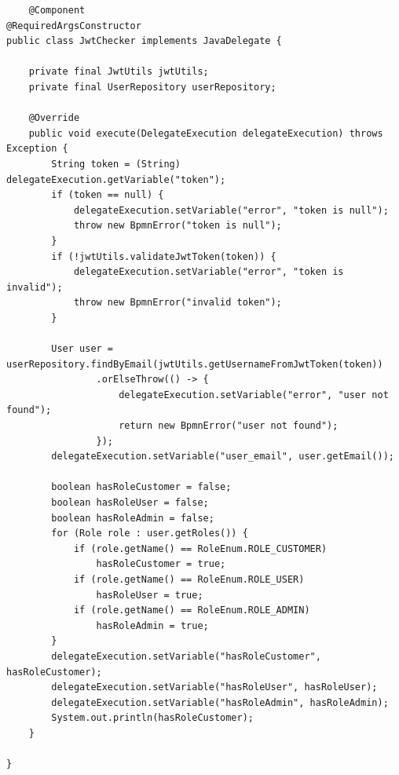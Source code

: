 \documentclass{article}
\begin{document}
\begin{lstlisting}
    @Component
@RequiredArgsConstructor
public class JwtChecker implements JavaDelegate {

    private final JwtUtils jwtUtils;
    private final UserRepository userRepository;

    @Override
    public void execute(DelegateExecution delegateExecution) throws Exception {
        String token = (String) delegateExecution.getVariable("token");
        if (token == null) {
            delegateExecution.setVariable("error", "token is null");
            throw new BpmnError("token is null");
        }
        if (!jwtUtils.validateJwtToken(token)) {
            delegateExecution.setVariable("error", "token is invalid");
            throw new BpmnError("invalid token");
        }

        User user = userRepository.findByEmail(jwtUtils.getUsernameFromJwtToken(token))
                .orElseThrow(() -> {
                    delegateExecution.setVariable("error", "user not found");
                    return new BpmnError("user not found");
                });
        delegateExecution.setVariable("user_email", user.getEmail());

        boolean hasRoleCustomer = false;
        boolean hasRoleUser = false;
        boolean hasRoleAdmin = false;
        for (Role role : user.getRoles()) {
            if (role.getName() == RoleEnum.ROLE_CUSTOMER)
                hasRoleCustomer = true;
            if (role.getName() == RoleEnum.ROLE_USER)
                hasRoleUser = true;
            if (role.getName() == RoleEnum.ROLE_ADMIN)
                hasRoleAdmin = true;
        }
        delegateExecution.setVariable("hasRoleCustomer", hasRoleCustomer);
        delegateExecution.setVariable("hasRoleUser", hasRoleUser);
        delegateExecution.setVariable("hasRoleAdmin", hasRoleAdmin);
        System.out.println(hasRoleCustomer);
    }

}
\end{lstlisting}
\end{document}
